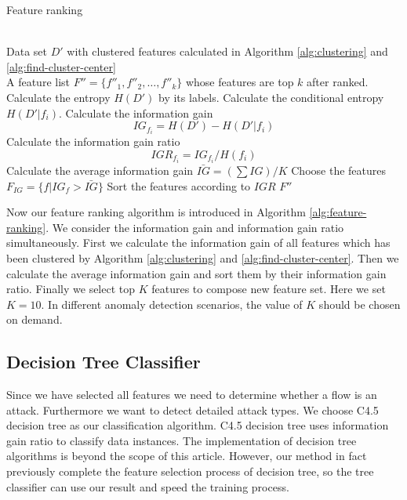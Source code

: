 \documentclass{ieeeaccess}
\theoremstyle{definition}
\begin{document}
\begin{algorithm}
    \caption{Feature ranking}
    \label{alg:feature-ranking}
    \begin{algorithmic}[1]
    \REQUIRE ~~\\
        Data set $D'$ with clustered features calculated in Algorithm \ref{alg:clustering} and \ref{alg:find-cluster-center}
    \ENSURE ~~\\
        A feature list $F''=\{f''_1, f''_2, \ldots, f''_k\}$ whose features are top $k$ after ranked. 
    \STATE Calculate the entropy $H(D')$ by its labels.
        \STATE Calculate the conditional entropy $H(D'|f_i)$.
        \STATE Calculate the information gain $$IG_{f_i} = H(D') - H(D'|f_i)$$
        \STATE Calculate the information gain ratio 
        $$IGR_{f_i} = IG_{f_i}/H(f_i)$$
    \ENDFOR
    \STATE Calculate the average information gain $\bar{IG}=(\sum IG) / K$
    \STATE Choose the features $F_{IG}=\{f|IG_{f} > \bar{IG}\}$
    \STATE Sort the features according to $IGR$
    \RETURN $F''$
    \end{algorithmic}
    \end{algorithm}

Now our feature ranking algorithm is introduced in Algorithm \ref{alg:feature-ranking}. We consider the information gain and information gain ratio simultaneously. First we calculate the information gain of all features which has been clustered by Algorithm \ref{alg:clustering} and \ref{alg:find-cluster-center}. Then we calculate the average information gain and sort them by their information gain ratio. Finally we select top $K$ features to compose new feature set. Here we set $K=10$. In different anomaly detection scenarios, the value of $K$ should be chosen on demand.



\subsection{Decision Tree Classifier}

Since we have selected all features we need to determine whether a flow is an attack. Furthermore we want to detect detailed attack types. We choose C4.5 decision tree\cite{quinlan2014c4} as our classification algorithm. C4.5 decision tree uses information gain ratio to classify data instances. The implementation of decision tree algorithms is beyond the scope of this article. However, our method in fact previously complete the feature selection process of decision tree, so the tree classifier can use our result and speed the training process.
\end{document}

